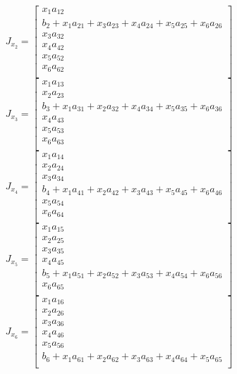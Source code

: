 \documentclass[a4paper, 12pt]{article}
\begin{document}
\begin{equation}
	J_{x_{2}} =
	\begin{bmatrix}
		x_{1}a_{12} \\
		b_{2}+x_{1}a_{21}+x_{3}a_{23}+x_{4}a_{24}+x_{5}a_{25}+x_{6}a_{26} \\
		x_{3}a_{32} \\
		x_{4}a_{42} \\
		x_{5}a_{52} \\
		x_{6}a_{62} \\
	\end{bmatrix}
\end{equation}
\begin{equation}
	J_{x_{3}} =
	\begin{bmatrix}
		x_{1}a_{13} \\
		x_{2}a_{23} \\
		b_{3}+x_{1}a_{31}+x_{2}a_{32}+x_{4}a_{34}+x_{5}a_{35}+x_{6}a_{36} \\
		x_{4}a_{43} \\
		x_{5}a_{53} \\
		x_{6}a_{63} \\
	\end{bmatrix}
\end{equation}
\begin{equation}
	J_{x_{4}} =
	\begin{bmatrix}
		x_{1}a_{14} \\
		x_{2}a_{24} \\
		x_{3}a_{34} \\
		b_{4}+x_{1}a_{41}+x_{2}a_{42}+x_{3}a_{43}+x_{5}a_{45}+x_{6}a_{46} \\
		x_{5}a_{54} \\
		x_{6}a_{64} \\
	\end{bmatrix}
\end{equation}
\begin{equation}
	J_{x_{5}} =
	\begin{bmatrix}
		x_{1}a_{15} \\
		x_{2}a_{25} \\
		x_{3}a_{35} \\
		x_{4}a_{45} \\
		b_{5}+x_{1}a_{51}+x_{2}a_{52}+x_{3}a_{53}+x_{4}a_{54}+x_{6}a_{56} \\
		x_{6}a_{65} \\
	\end{bmatrix}
\end{equation}
\begin{equation}
	J_{x_{6}} =
	\begin{bmatrix}
		x_{1}a_{16} \\
		x_{2}a_{26} \\
		x_{3}a_{36} \\
		x_{4}a_{46} \\
		x_{5}a_{56} \\
		b_{6}+x_{1}a_{61}+x_{2}a_{62}+x_{3}a_{63}+x_{4}a_{64}+x_{5}a_{65} \\
	\end{bmatrix}
\end{equation}
\end{document}

